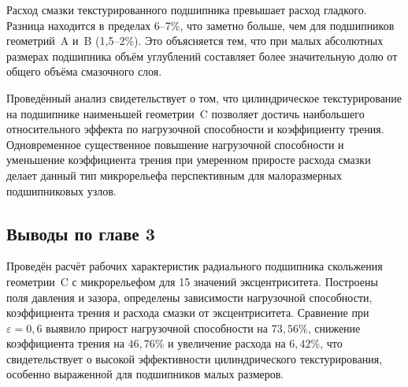 Расход смазки текстурированного подшипника превышает расход гладкого. Разница находится в пределах 6--7\%, что заметно больше, чем для подшипников геометрий~A и~B (1{,}5--2\%). Это объясняется тем, что при малых абсолютных размерах подшипника объём углублений составляет более значительную долю от общего объёма смазочного слоя.

Проведённый анализ свидетельствует о том, что цилиндрическое текстурирование на подшипнике наименьшей геометрии~C позволяет достичь наибольшего относительного эффекта по нагрузочной способности и коэффициенту трения. Одновременное существенное повышение нагрузочной способности и уменьшение коэффициента трения при умеренном приросте расхода смазки делает данный тип микрорельефа перспективным для малоразмерных подшипниковых узлов.

\subsection*{Выводы по главе 3}
{}

Проведён расчёт рабочих характеристик радиального подшипника скольжения геометрии~C с \varDimpleTypeGenitive{} микрорельефом для 15 значений эксцентриситета. Построены поля давления и зазора, определены зависимости нагрузочной способности, коэффициента трения и расхода смазки от эксцентриситета. Сравнение при $\varepsilon = 0{,}6$ выявило прирост нагрузочной способности на $73{,}56$\%, снижение коэффициента трения на $46{,}76$\% и увеличение расхода на $6{,}42$\%, что свидетельствует о высокой эффективности цилиндрического текстурирования, особенно выраженной для подшипников малых размеров.
